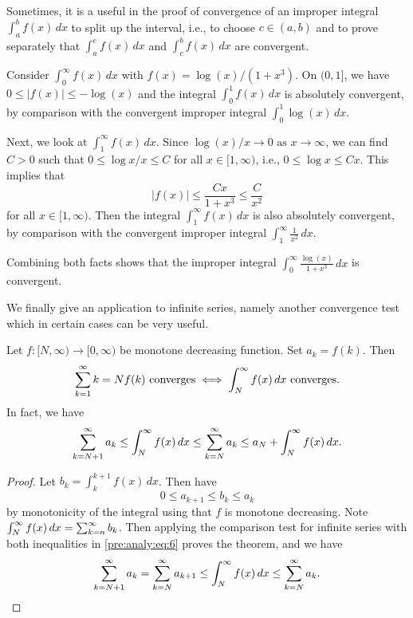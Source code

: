 \documentclass[10pt, a4paper]{article}
\newcommand{\limas}[3][n]{#2 \rightarrow #3 \text{ as } #1 \rightarrow \infty}
\begin{document}
Sometimes,
it is a useful in the proof of convergence of an improper integral $\int_{a}^{b}f(x)\,dx$ to split up the interval,
i.e.,
to choose $c \in (a, b)$ and to prove separately that $\int_{a}^{c}f(x)\,dx$ and $\int_{c}^{b}f(x)\,dx$ are convergent.

\begin{example}
    Consider $\int_{0}^{\infty}f(x)\,dx$ with $f(x) = \log(x) / (1 + x ^ 3)$.
    On $(0, 1]$,
    we have $0 \leq |f(x)| \leq -\log(x)$ and the integral $\int_{0}^{1}f(x)\,dx$ is absolutely convergent,
    by comparison with the convergent improper integral $\int_{0}^{1}\log(x)\,dx$.

    Next,
    we look at $\int_{1}^{\infty}f(x)\,dx$.
    Since $\limas[x]{\log(x) / x}{0}$,
    we can find $C > 0$ such that $0 \leq \log{x} / x \leq C$ for all $x \in [1, \infty)$,
    i.e.,
    $0 \leq \log{x} \leq Cx$.
    This implies that
    \[
    |f(x)| \leq \frac{Cx}{1 + x ^ 3} \leq \frac{C}{x ^ 2}
    \]
    for all $x \in [1, \infty)$.
    Then the integral $\int_{1}^{\infty}f(x)\,dx$ is also absolutely convergent,
    by comparison with the convergent improper integral $\int_{1}^{\infty}\frac{1}{x ^ 2}\,dx$.

    Combining both facts shows that the improper integral $\displaystyle\int_{0}^{\infty}\frac{\log(x)}{1 + x ^ 3}\,dx$ is convergent.
\end{example}

We finally give an application to infinite series,
namely another convergence test which in certain cases can be very useful.

\begin{theorem}
    Let $f : [N, \infty) \rightarrow [0, \infty)$ be monotone decreasing function.
    Set $a_k = f(k)$.
    Then
    \[
    \infsum{k = N}f(k)\text{ converges} \iff \int_{N}^{\infty}f(x)\,dx\text{ converges}.
    \]
    In fact,
    we have
    \begin{equation}\label{pre:analy:eq:6}
        \infsum[k = N + 1]a_k \leq \int_{N}^{\infty}f(x)\,dx \leq \infsum[k = N]a_k \leq a_N + \int_{N}^{\infty}f(x)\,dx.
    \end{equation}
    \begin{proof}
        Let $b_k = \int_{k}^{k + 1}f(x)\,dx$.
        Then have
        \[
        0 \leq a_{k + 1} \leq b_k \leq a_k
        \]
        by monotonicity of the integral using that $f$ is monotone decreasing.
        Note $\int_{N}^{\infty}f(x)\,dx = \infsum[k = n]b_k$.
        Then applying the comparison test for infinite series with both inequalities in \eqref{pre:analy:eq:6} proves the theorem,
        and we have
        \[
        \infsum[k = N + 1]a_k = \infsum[k = N]a_{k + 1} \leq \int_{N}^{\infty}f(x)\,dx \leq \infsum[k = N]a_k.
        \]
    \end{proof}
\end{theorem}
\end{document}
